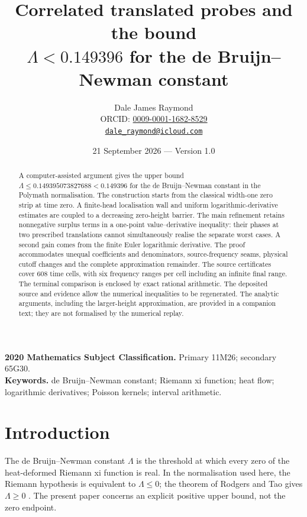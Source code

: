 \documentclass[11pt,a4paper]{article}
\title{Correlated translated probes and the bound\\$\Lambda<0.149396$ for the de Bruijn--Newman constant}
\author{Dale James Raymond\\[3pt]
\small ORCID: \href{https://orcid.org/0009-0001-1682-8529}{0009-0001-1682-8529}\\
\small \href{mailto:dale_raymond@icloud.com}{\texttt{dale\_raymond@icloud.com}}}
\date{21 September 2026 --- Version 1.0}
\begin{document}
\maketitle
\begin{abstract}
A computer-assisted argument gives the upper bound
$\Lambda\le0.149395073827688<0.149396$
for the de Bruijn--Newman constant in the Polymath normalisation.
The construction starts from the classical width-one zero strip at time zero.
A finite-head localisation wall and uniform logarithmic-derivative estimates
are coupled to a decreasing zero-height barrier.
The main refinement retains nonnegative surplus terms in a one-point
value--derivative inequality: their phases at two prescribed translations
cannot simultaneously realise the separate worst cases.
A second gain comes from the finite Euler logarithmic derivative.
The proof accommodates unequal coefficients and denominators, source-frequency
seams, physical cutoff changes and the complete approximation remainder.
The source certificates cover 608 time cells, with six frequency ranges per
cell including an infinite final range. The terminal comparison is enclosed
by exact rational arithmetic. The deposited source and evidence allow the
numerical inequalities to be regenerated. The analytic arguments, including
the larger-height approximation, are provided in a companion text; they are
not formalised by the numerical replay.
\end{abstract}
\noindent\textbf{2020 Mathematics Subject Classification.} Primary 11M26; secondary 65G30.\\
\textbf{Keywords.} de Bruijn--Newman constant; Riemann xi function; heat flow;
logarithmic derivatives; Poisson kernels; interval arithmetic.

\section{Introduction}\label{sec:introduction}
The de Bruijn--Newman constant $\Lambda$ is the threshold at which every zero
of the heat-deformed Riemann xi function is real. In the normalisation used
here, the Riemann hypothesis is equivalent to $\Lambda\le0$; the theorem
of Rodgers and Tao gives $\Lambda\ge0$ \cite{polymath,rodgerstao}.
The present paper concerns an explicit positive upper bound, not the
zero endpoint.
\end{document}
